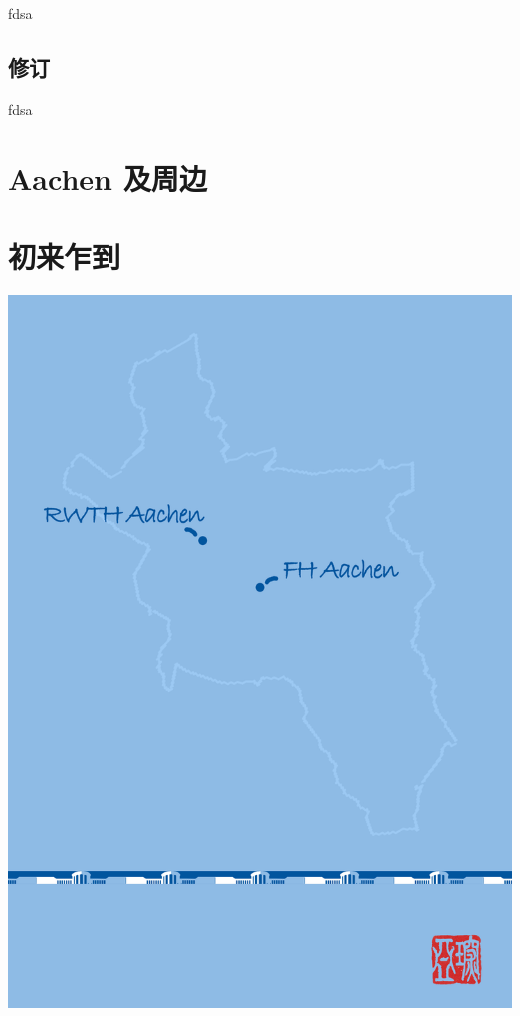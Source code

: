 \documentclass[a4paper,10pt,openany]{scrbook}
\begin{document}
fdsa


\newpage

\chapter*{修订}

fdsa


\tableofcontents

\mainmatter

\part{Aachen 及周边}




\part{初来乍到}

%
%
%
%
%
%
%
%


\begin{titlepage}
\parindent=0pt
\includegraphics[width=\linewidth]{Bilder/Back_Cover_.jpg}
\end{titlepage}
\end{document}
